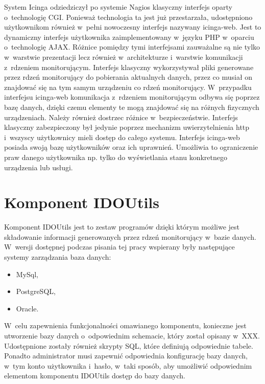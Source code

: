 System Icinga odziedziczył po systemie Nagios klasyczny interfejs
oparty o~technologię CGI. Ponieważ technologia ta jest już
przestarzała, udostępniono użytkownikom również w~pełni nowoczesny
interfejs nazywany icinga-web. Jest to dynamiczny interfejs
użytkownika zaimplementowany w~języku PHP w~oparciu o~technologię
AJAX. Różnice pomiędzy tymi interfejsami zauważalne są nie tylko
w~warstwie prezentacji lecz również w~architekturze i~warstwie
komunikacji z~rdzeniem monitorującym. Interfejs klasyczny
wykorzystywał pliki generowane przez rdzeń monitorujący do pobierania
aktualnych danych, przez co musiał on znajdować się na tym samym
urządzeniu co rdzeń monitorujący. W~przypadku interfejsu icinga-web
komunikacja z~rdzeniem monitorującym odbywa się poprzez bazę danych,
dzięki czemu elementy te mogą znajdować się na różnych fizycznych
urządzeniach. Należy również dostrzec różnice
w~bezpieczeństwie. Interfejs klasyczny zabezpieczony był jedynie
poprzez mechanizm uwierzytelnienia http i~wszyscy użytkownicy mieli
dostęp do całego systemu. Interfejs icinga-web posiada swoją bazę
użytkowników oraz ich uprawnień. Umożliwia to ograniczenie praw danego
użytkownika np. tylko do wyświetlania stanu konkretnego urządzenia lub
usługi.

\section[Komponent IDOUtils][Komponent IDOUtils]{Komponent IDOUtils}
\label{sec:IDOUtils}

Komponent IDOUtils jest to zestaw programów dzięki którym możliwe jest
składowanie informacji generowanych przez rdzeń monitorujący w~bazie
danych. W~wersji dostępnej podczas pisania tej pracy wspierany były
następujące systemy zarządzania baza danych:

\begin{itemize}
\item MySql,
\item PostgreSQL,
\item Oracle.
\end{itemize}

W~celu zapewnienia funkcjonalności omawianego komponentu, konieczne
jest utworzenie bazy danych o~odpowiednim schemacie, który został
opisany w~XXX. Udostępnione zostały również skrypty SQL, które
definiują odpowiednie tabele. Ponadto administrator musi zapewnić
odpowiednia konfigurację bazy danych, w~tym konto użytkownika i~hasło,
w~taki sposób, aby umożliwić odpowiednim elementom komponentu
IDOUtils dostęp do bazy danych.

